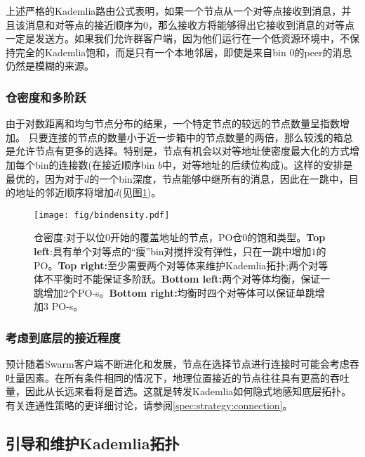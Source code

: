 上述严格的Kademlia路由公式表明，如果一个节点从一个对等点接收到消息，并且该消息和对等点的接近顺序为$0$，那么接收方将能够得出它接收到消息的对等点一定是发送方。如果我们允许群客户端，因为他们运行在一个低资源环境中，不保持完全的Kademlia饱和，而是只有一个本地邻居，即使是来自bin $0$的peer的消息仍然是模糊的来源。 

\subsubsection{仓密度和多阶跃} \label{sec:bindensity}

由于对数距离和均匀节点分布的结果，一个特定节点的较远的节点数量呈指数增加。
只要连接的节点的数量小于近一步箱中的节点数量的两倍，那么较浅的箱总是允许节点有更多的选择。特别是，节点有机会以对等地址使密度最大化的方式增加每个bin的连接数(在接近顺序bin $b$中，对等地址的后续位构成)。这样的安排是最优的，因为对于$d$的一个bin深度，节点能够中继所有的消息，因此在一跳中，目的地址的邻近顺序将增加$d$(见图\ref{fig:bindensity})。 


\begin{figure}[htbp]
   \centering
   \texttt{[image: fig/bindensity.pdf]}
   \caption[本密度\statusgreen]{仓密度:对于以位$0$开始的覆盖地址的节点，PO仓$0$的饱和类型。\textbf{Top left}:具有单个对等点的“瘦”bin对搅拌没有弹性，只在一跳中增加$1$的PO。\textbf{Top right:}至少需要两个对等体来维护Kademlia拓扑;两个对等体不平衡时不能保证多阶跃。\textbf{Bottom left:}两个对等体均衡，保证一跳增加2个PO-s。\textbf{Bottom right:}均衡时四个对等体可以保证单跳增加$3$ PO-s。}
   \label{fig:bindensity}
\end{figure}

\subsubsection{考虑到底层的接近程度}
预计随着Swarm客户端不断进化和发展，节点在选择节点进行连接时可能会考虑吞吐量因素。在所有条件相同的情况下，地理位置接近的节点往往具有更高的吞吐量，因此从长远来看将是首选。这就是转发Kademlia如何隐式地感知底层拓扑\cite{heep2010r}。有关连通性策略的更详细讨论，请参阅\ref{spec:strategy:connection}。


\subsection{引导和维护Kademlia拓扑\statusgreen}\label{sec:bootstrapping}
 
 

